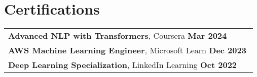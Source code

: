 \documentclass[letterpaper,11pt]{article}
\begin{document}
\section{Certifications}
\begin{tabular}{p{0.99\linewidth}}
    \hspace{0.15in}\textbf{Advanced NLP with Transformers}, Coursera
        \hfill \textbf{Mar 2024} \\
    \hspace{0.15in}\textbf{AWS Machine Learning Engineer}, Microsoft Learn
        \hfill \textbf{Dec 2023}\\
    \hspace{0.15in}\textbf{Deep Learning Specialization}, LinkedIn Learning
        \hfill \textbf{Oct 2022}\\
\end{tabular}
\end{document}
